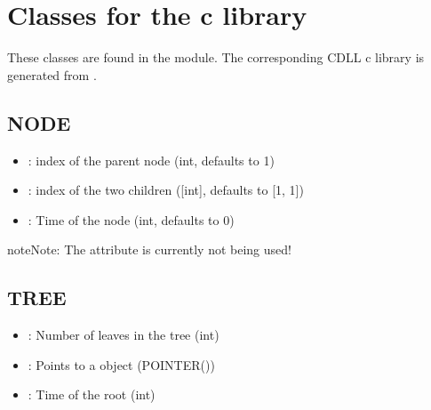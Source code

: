 \documentclass[letterpaper,10pt,english]{sphinxmanual}
\begin{document}
\section{Classes for the c library}
\label{\detokenize{trees:classes-for-the-c-library}}\label{\detokenize{trees:c-classes}}
\sphinxAtStartPar
These classes are found in the  module.
The corresponding CDLL c library is generated from .


\subsection{NODE}
\label{\detokenize{trees:node}}\begin{itemize}
\item {} 
\sphinxAtStartPar
{}: index of the parent node (int, defaults to \sphinxhyphen{}1)

\item {} 
\sphinxAtStartPar
{}: index of the two children ({[}int{]}, defaults to {[}\sphinxhyphen{}1, \sphinxhyphen{}1{]})

\item {} 
\sphinxAtStartPar
{}: Time of the node (int, defaults to 0)

\end{itemize}

\begin{sphinxadmonition}{note}{Note:}
\sphinxAtStartPar
The attribute  is currently not being used!
\end{sphinxadmonition}


\subsection{TREE}
\label{\detokenize{trees:tree}}\begin{itemize}
\item {} 
\sphinxAtStartPar
{}: Number of leaves in the tree (int)

\item {} 
\sphinxAtStartPar
{}: Points to a  object (POINTER())

\item {} 
\sphinxAtStartPar
{}: Time of the root  (int)

\end{itemize}
\end{document}
